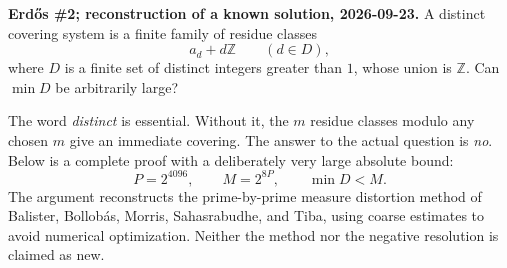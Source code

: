 \textbf{Erd\H{o}s \#2; reconstruction of a known solution, 2026-09-23.}
A distinct covering system is a finite family of residue classes
\[
 a_d+d\mathbb Z\qquad(d\in D),
\]
where $D$ is a finite set of distinct integers greater than $1$, whose union is $\mathbb Z$. Can $\min D$ be arbitrarily large?

The word \emph{distinct} is essential. Without it, the $m$ residue classes modulo any chosen $m$ give an immediate covering. The answer to the actual question is \emph{no}. Below is a complete proof with a deliberately very large absolute bound:
\[
 P=2^{4096},\qquad M=2^{8P},\qquad \min D<M.
\]
The argument reconstructs the prime-by-prime measure distortion method of Balister, Bollob\'as, Morris, Sahasrabudhe, and Tiba, using coarse estimates to avoid numerical optimization. Neither the method nor the negative resolution is claimed as new.
